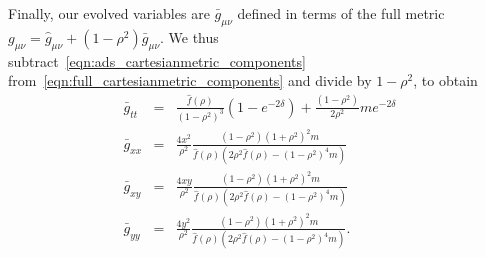 \documentclass[prl,twocolumn,superscriptaddress]{revtex4-1}
\begin{document}
Finally, our evolved variables are $\bar{g}_{\mu\nu}$ defined in terms of the full metric $g_{\mu\nu}=\hat{g}_{\mu\nu}+(1-\rho^2)\bar{g}_{\mu\nu}$.
We thus subtract~\eqref{eqn:ads_cartesianmetric_components} from~\eqref{eqn:full_cartesianmetric_components} and divide by $1-\rho^2$, to obtain
\begin{eqnarray}\label{eqn:barred_cartesianmetric_components}
\bar{g}_{tt} &=& \frac{\hat{f}(\rho)}{(1-\rho^2)^3} (1-e^{-2\delta}) + \frac{(1-\rho^2)}{2\rho^2} m e^{-2\delta} \nonumber \\
\bar{g}_{xx} &=& \frac{4x^2}{\rho^2} \frac{(1-\rho^2) (1+\rho^2)^2 m}{\hat{f}(\rho) \left( 2\rho^2\hat{f}(\rho)-(1-\rho^2)^4 m \right)} \nonumber \\
\bar{g}_{xy} &=& \frac{4xy}{\rho^2} \frac{(1-\rho^2) (1+\rho^2)^2 m}{\hat{f}(\rho) \left( 2\rho^2\hat{f}(\rho)-(1-\rho^2)^4 m \right)} \nonumber \\
\bar{g}_{yy} &=& \frac{4y^2}{\rho^2} \frac{(1-\rho^2) (1+\rho^2)^2 m}{\hat{f}(\rho) \left( 2\rho^2\hat{f}(\rho)-(1-\rho^2)^4 m \right)}.
\end{eqnarray}



\end{document}
